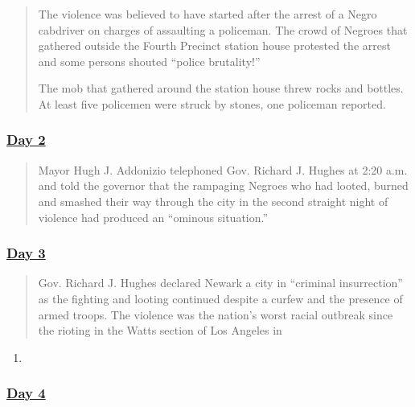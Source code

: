 \begin{quote}
The violence was believed to have started after the arrest of a Negro
cabdriver on charges of assaulting a policeman. The crowd of Negroes
that gathered outside the Fourth Precinct station house protested the
arrest and some persons shouted ``police brutality!''

The mob that gathered around the station house threw rocks and bottles.
At least five policemen were struck by stones, one policeman reported.
\end{quote}

\hypertarget{day-2}{%
\subsubsection{\texorpdfstring{\href{https://timesmachine.nytimes3xbfgragh.onion/timesmachine/1967/07/14/83616047.html?pageNumber=1}{Day
2}}{Day 2}}\label{day-2}}

\begin{quote}
Mayor Hugh J. Addonizio telephoned Gov. Richard J. Hughes at 2:20 a.m.
and told the governor that the rampaging Negroes who had looted, burned
and smashed their way through the city in the second straight night of
violence had produced an ``ominous situation.''
\end{quote}

\hypertarget{day-3}{%
\subsubsection{\texorpdfstring{\href{https://timesmachine.nytimes3xbfgragh.onion/timesmachine/1967/07/15/83616900.html?pageNumber=1}{Day
3}}{Day 3}}\label{day-3}}

\begin{quote}
Gov. Richard J. Hughes declared Newark a city in ``criminal
insurrection'' as the fighting and looting continued despite a curfew
and the presence of armed troops. The violence was the nation's worst
racial outbreak since the rioting in the Watts section of Los Angeles in
\end{quote}

\begin{enumerate}
\def\labelenumi{\arabic{enumi}.}
\setcounter{enumi}{1964}
\item
\end{enumerate}

\hypertarget{day-4}{%
\subsubsection{\texorpdfstring{\href{https://timesmachine.nytimes3xbfgragh.onion/timesmachine/1967/07/16/83617964.html?pageNumber=1}{Day
4}}{Day 4}}\label{day-4}}

